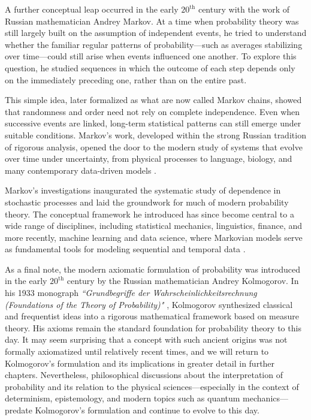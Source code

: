 \medskip

A further conceptual leap occurred in the early $20^{\text{th}}$ century with the work of Russian mathematician Andrey Markov. At a time when probability theory was still largely built on the assumption of independent events, he tried to understand whether the familiar regular patterns of probability—such as averages stabilizing over time—could still arise when events influenced one another. To explore this question, he studied sequences in which the outcome of each step depends only on the immediately preceding one, rather than on the entire past.

This simple idea, later formalized as what are now called Markov chains, showed that randomness and order need not rely on complete independence. Even when successive events are linked, long-term statistical patterns can still emerge under suitable conditions. Markov’s work, developed within the strong Russian tradition of rigorous analysis, opened the door to the modern study of systems that evolve over time under uncertainty, from physical processes to language, biology, and many contemporary data-driven models \cite{markov_1906_extension}.

Markov’s investigations inaugurated the systematic study of dependence in stochastic processes and laid the groundwork for much of modern probability theory. The conceptual framework he introduced has since become central to a wide range of disciplines, including statistical mechanics, linguistics, finance, and more recently, machine learning and data science, where Markovian models serve as fundamental tools for modeling sequential and temporal data \cite{doob_1953_stochastic}.

\medskip

As a final note, the modern axiomatic formulation of probability was introduced in the early $20^{\text{th}}$ century by the Russian mathematician Andrey Kolmogorov. In his 1933 monograph \textit{``Grundbegriffe der Wahrscheinlichkeitsrechnung (Foundations of the Theory of Probability)"} \cite{kolmogorov_1933_grundbegriffe}, Kolmogorov synthesized classical and frequentist ideas into a rigorous mathematical framework based on measure theory. His axioms remain the standard foundation for probability theory to this day. It may seem surprising that a concept with such ancient origins was not formally axiomatized until relatively recent times, and we will return to Kolmogorov’s formulation and its implications in greater detail in further chapters. Nevertheless, philosophical discussions about the interpretation of probability and its relation to the physical sciences—especially in the context of determinism, epistemology, and modern topics such as quantum mechanics—predate Kolmogorov's formulation and continue to evolve to this day.
